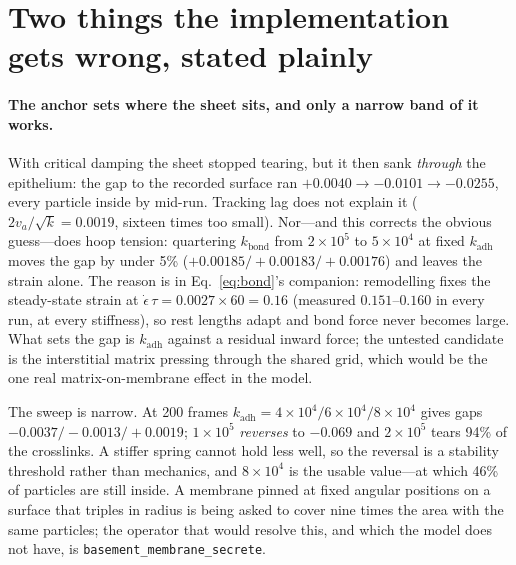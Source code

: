 \documentclass[10pt]{article}
\newcommand{\op}[1]{\texttt{#1}}
\begin{document}
\section{Two things the implementation gets wrong, stated plainly}

\paragraph{The anchor sets where the sheet sits, and only a narrow band of it works.} With critical
damping the sheet stopped tearing, but it then sank \emph{through} the epithelium: the gap to the
recorded surface ran $+0.0040\to-0.0101\to-0.0255$, every particle inside by mid-run. Tracking lag does
not explain it ($2v_a/\sqrt{k}=0.0019$, sixteen times too small). Nor---and this corrects the obvious
guess---does hoop tension: quartering $k_{\text{bond}}$ from $2\times10^5$ to $5\times10^4$ at fixed
$k_{\text{adh}}$ moves the gap by under 5\% ($+0.00185/{+}0.00183/{+}0.00176$) and leaves the strain
alone. The reason is in Eq.~\eqref{eq:bond}'s companion: remodelling fixes the steady-state strain at
$\dot\epsilon\,\tau=0.0027\times60=0.16$ (measured $0.151$--$0.160$ in every run, at every stiffness),
so rest lengths adapt and bond force never becomes large. What sets the gap is $k_{\text{adh}}$ against a
residual inward force; the untested candidate is the interstitial matrix pressing through the shared
grid, which would be the one real matrix-on-membrane effect in the model.

The sweep is narrow. At 200 frames $k_{\text{adh}}=4\times10^4/6\times10^4/8\times10^4$ gives gaps
$-0.0037/-0.0013/+0.0019$; $1\times10^5$ \emph{reverses} to $-0.069$ and $2\times10^5$ tears 94\% of
the crosslinks. A stiffer spring cannot hold less well, so the reversal is a stability threshold rather
than mechanics, and $8\times10^4$ is the usable value---at which 46\% of particles are still inside.
A membrane pinned at fixed angular positions on a surface that triples in radius is being asked to cover
nine times the area with the same particles; the operator that would resolve this, and which the model
does not have, is \op{basement\_membrane\_secrete}.
\end{document}
